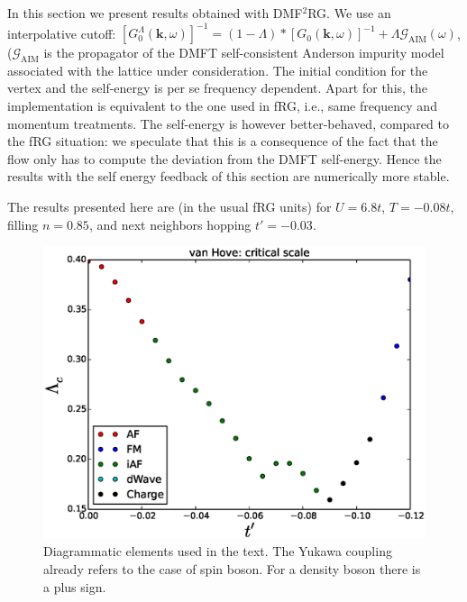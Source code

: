 In this section we present results obtained with DMF$^2$RG.  We use an interpolative cutoff: $[G_0^\Lambda(\mathbf{k},\omega)]^{-1} = (1-\Lambda)*[G_0(\mathbf{k},\omega)]^{-1}+\Lambda \mathcal{G}_{\mathrm{AIM}}(\omega)$, ($\mathcal{G}_{\mathrm{AIM}}$ is the propagator of the DMFT self-consistent Anderson impurity model associated with the lattice under consideration. The initial condition for the vertex and the self-energy is per se frequency dependent. 
Apart for this, the implementation is equivalent to the one used in fRG, i.e., same frequency and momentum treatments. 
The self-energy is however better-behaved, compared to the fRG situation: we speculate that this is a consequence of the fact that the flow only has to compute the deviation from the DMFT self-energy. Hence the results with the self energy feedback of this section are numerically more stable.  

The results presented here are (in the usual fRG units) for $U=6.8t$, $T=-0.08t$, filling $n=0.85$, and next neighbors hopping $t'=-0.03$.  


\begin{figure}
\includegraphics[scale=0.5]{vanHove_scan_critical_lambda_phi.eps}
\caption{Diagrammatic elements used in the text. The Yukawa coupling already refers to the case of spin boson. For a density boson there is a plus sign. } \label{dictionary}

\end{figure}

